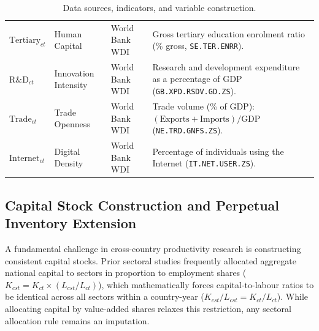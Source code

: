 \documentclass[11pt,a4paper]{article}
\begin{document}
\begin{table}[!htbp]
\begin{tabularx}{\textwidth}{@{}l l l >{\raggedright\arraybackslash}X@{}}
$\text{Tertiary}_{ct}$ & Human Capital & World Bank WDI & Gross tertiary education enrolment ratio (\% gross, \texttt{SE.TER.ENRR}). \\
$\text{R\&D}_{ct}$ & Innovation Intensity & World Bank WDI & Research and development expenditure as a percentage of GDP (\texttt{GB.XPD.RSDV.GD.ZS}). \\
$\text{Trade}_{ct}$ & Trade Openness & World Bank WDI & Trade volume (\% of GDP): $(\text{Exports} + \text{Imports})/\text{GDP}$ (\texttt{NE.TRD.GNFS.ZS}). \\
$\text{Internet}_{ct}$ & Digital Density & World Bank WDI & Percentage of individuals using the Internet (\texttt{IT.NET.USER.ZS}). \\
\bottomrule
\end{tabularx}
\caption{Data sources, indicators, and variable construction.}
\label{tab:data_sources}
\end{table}

\subsection{Capital Stock Construction and Perpetual Inventory Extension}
A fundamental challenge in cross-country productivity research is constructing consistent capital stocks. Prior sectoral studies frequently allocated aggregate national capital to sectors in proportion to employment shares ($K_{cst} = K_{ct} \times (L_{cst}/L_{ct})$), which mathematically forces capital-to-labour ratios to be identical across all sectors within a country-year ($K_{cst}/L_{cst} = K_{ct}/L_{ct}$). While allocating capital by value-added shares relaxes this restriction, any sectoral allocation rule remains an imputation. 
\end{document}
